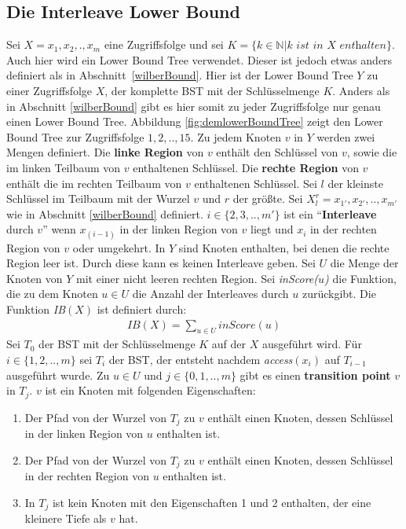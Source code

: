 \documentclass[a4paper,12pt]{article}
\begin{document}
\subsection{Die Interleave Lower Bound} \label{interBound}
Sei $X = x_1,x_2,.,x_m$ eine Zugriffsfolge und sei $K = \{k \in \mathbb{N} \vert k \textit{ ist in $X$ enthalten}\}$. Auch hier wird ein Lower Bound Tree verwendet. Dieser ist jedoch etwas anders definiert als in \mbox{Abschnitt \ref{wilberBound}}. Hier ist der Lower Bound Tree $Y$ zu einer Zugriffsfolge $X$, der komplette BST mit der Schlüsselmenge $K$. Anders als in Abschnitt \ref{wilberBound}  gibt es hier somit zu jeder Zugriffsfolge nur genau einen Lower Bound Tree. Abbildung \ref{fig:demlowerBoundTree} zeigt den Lower Bound Tree zur Zugriffsfolge $1, 2,.., 15$. Zu jedem Knoten $v$ in $Y$ werden zwei Mengen definiert. Die \textbf{linke Region} von $v$ enthält den Schlüssel von $v$, sowie die im linken Teilbaum von $v$ enthaltenen Schlüssel.  Die \textbf{rechte Region} von $v$ enthält die im rechten Teilbaum von $v$ enthaltenen Schlüssel. Sei $l$ der kleinste Schlüssel im Teilbaum mit der Wurzel $v$ und $r$ der größte. Sei  $X^r_l = {x_{1'},x_{2'},..,x_{m'}}$ wie in Abschnitt \ref{wilberBound} definiert. $i \in \{2,3,..,m'\}$ ist ein \enquote{\textbf{Interleave} durch $v$} wenn $x_{\left(i -1\right)}$ in der linken Region von $v$ liegt und $x_i$ in der rechten Region von $v$ oder umgekehrt. In $Y$ sind Knoten enthalten, bei denen die rechte Region leer ist. Durch diese kann es keinen Interleave geben. Sei $U$ die Menge der Knoten von $Y$ mit einer nicht leeren rechten Region. Sei \textit{inScore($u$)} die Funktion, die zu dem Knoten $u \in U$ die Anzahl der Interleaves durch $u$ zurückgibt.  Die Funktion \textit{IB}$\left(X\right)$ ist definiert durch:
\begin{align*}
\mathit{IB}\left(X\right) = \sum_{u \in U} \mathit{inScore}\left(u\right)
\end{align*}
Sei $T_0$ der BST mit der Schlüsselmenge $K$ auf der $X$ ausgeführt wird. Für $i \in \{1,2,..,m\}$ sei $T_i$ der BST, der entsteht nachdem \textit{access}$\left(x_i\right)$ auf $T_{i-1}$ ausgeführt wurde. Zu $u \in U$ und  $j \in \{0,1,..,m\}$ gibt es einen \textbf{transition point} $v$ in $T_j$. $v$ ist ein Knoten mit folgenden Eigenschaften:\\
\begin{enumerate}
	\item Der Pfad von der Wurzel von $T_j$ zu $v$ enthält einen Knoten, dessen Schlüssel in der linken Region von $u$ enthalten ist.
	\item Der Pfad von der Wurzel von $T_j$ zu $v$ enthält einen Knoten, dessen Schlüssel in der rechten Region von $u$ enthalten ist.
	\item In $T_j$ ist kein Knoten mit den Eigenschaften 1 und 2 enthalten, der eine kleinere Tiefe als $v$ hat. 
\end{enumerate}
\end{document}
